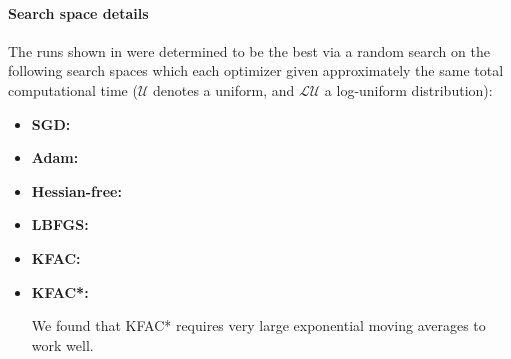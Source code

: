 \paragraph{Search space details} The runs shown in
 were determined to be the best
via a random search on the following search spaces which each
optimizer given approximately the same total
computational time ($\mathcal{U}$ denotes a uniform,
and $\mathcal{LU}$ a log-uniform distribution):
\begin{itemize}
  \def\pathToRuns{kfac_pinns_exp/exp43_log_fokker_planck9d_isotropic_gaussian_random/tex}
\item \textbf{SGD:} 
\item \textbf{Adam:} 
\item \textbf{Hessian-free:} 
\item \textbf{LBFGS:} 
\item \textbf{KFAC:} 
\item \textbf{KFAC*:} 

  We found that KFAC* requires very large exponential moving averages to work well.
\end{itemize}

